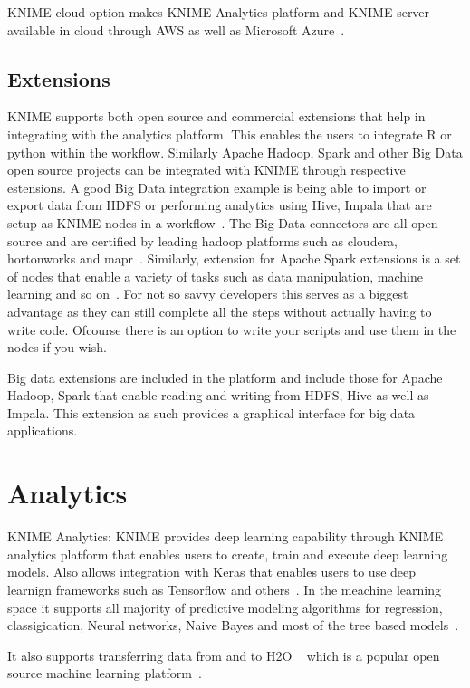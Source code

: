 KNIME cloud option makes KNIME Analytics platform and KNIME server
available in cloud through AWS as well as Microsoft
Azure~\cite{hid-sp18-517-cloud}.

\subsection{Extensions}
KNIME supports both open source and commercial extensions that help in
integrating with the analytics platform. This enables the users to
integrate R or python within the workflow. Similarly Apache Hadoop,
Spark and other Big Data open source projects can be integrated with
KNIME through respective estensions. A good Big Data integration
example is being able to import or export data from HDFS or performing
analytics using Hive, Impala that are setup as KNIME nodes in a
workflow~\cite{hid-sp18-517-ksw}. The Big Data connectors are all open
source and are certified by leading hadoop platforms such as cloudera,
hortonworks and mapr~\cite{hid-sp18-517-bde}.  Similarly, extension
for Apache Spark extensions is a set of nodes that enable a variety of
tasks such as data manipulation, machine learning and so
on~\cite{hid-sp18-517-spark}.  For not so savvy developers this serves
as a biggest advantage as they can still complete all the steps
without actually having to write code. Ofcourse there is an option to
write your scripts and use them in the nodes if you wish.


Big data extensions are included in the platform and include those for
Apache Hadoop, Spark that enable reading and writing from HDFS, Hive
as well as Impala. This extension as such provides a graphical
interface for big data applications.

\section{Analytics}
KNIME Analytics: KNIME provides deep learning capability through KNIME
analytics platform that enables users to create, train and execute
deep learning models. Also allows integration with Keras that enables
users to use deep learnign frameworks such as Tensorflow and
others~\cite{hid-sp18-517-dl}. In the meachine learning space it
supports all majority of predictive modeling algorithms for
regression, classigication, Neural networks, Naive Bayes and most of
the tree based models~\cite{hid-sp18-517-pml}.

It also supports transferring data from and to H2O
~\cite{hid-sp18-517-h20} which is a popular open source machine
learning platform~\cite{hid-sp18-517-knimeh20}.

